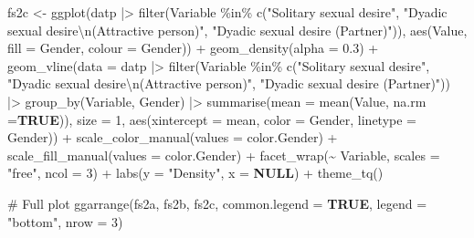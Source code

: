 \documentclass[
  bookmarksnumbered]{article}
\newenvironment{Shaded}{\begin{snugshade}}{\end{snugshade}}
\newcommand{\AttributeTok}[1]{\textcolor[rgb]{0.80,0.80,0.80}{#1}}
\newcommand{\CommentTok}[1]{\textcolor[rgb]{0.50,0.62,0.50}{#1}}
\newcommand{\ConstantTok}[1]{\textcolor[rgb]{0.86,0.64,0.64}{\textbf{#1}}}
\newcommand{\DecValTok}[1]{\textcolor[rgb]{0.86,0.86,0.80}{#1}}
\newcommand{\FloatTok}[1]{\textcolor[rgb]{0.75,0.75,0.82}{#1}}
\newcommand{\FunctionTok}[1]{\textcolor[rgb]{0.94,0.94,0.56}{#1}}
\newcommand{\NormalTok}[1]{\textcolor[rgb]{0.80,0.80,0.80}{#1}}
\newcommand{\OtherTok}[1]{\textcolor[rgb]{0.94,0.94,0.56}{#1}}
\newcommand{\SpecialCharTok}[1]{\textcolor[rgb]{0.86,0.64,0.64}{#1}}
\newcommand{\StringTok}[1]{\textcolor[rgb]{0.80,0.58,0.58}{#1}}
\begin{document}
\begin{Shaded}
\begin{Highlighting}[]
\NormalTok{fs2c }\OtherTok{\textless{}{-}} \FunctionTok{ggplot}\NormalTok{(datp }\SpecialCharTok{|\textgreater{}}
                 \FunctionTok{filter}\NormalTok{(Variable }\SpecialCharTok{\%in\%} \FunctionTok{c}\NormalTok{(}\StringTok{"Solitary sexual desire"}\NormalTok{,}
                                        \StringTok{"Dyadic sexual desire}\SpecialCharTok{\textbackslash{}n}\StringTok{(Attractive person)"}\NormalTok{,}
                                        \StringTok{"Dyadic sexual desire (Partner)"}\NormalTok{)),}
             \FunctionTok{aes}\NormalTok{(Value,}
                 \AttributeTok{fill =}\NormalTok{ Gender,}
                 \AttributeTok{colour =}\NormalTok{ Gender)) }\SpecialCharTok{+}
        \FunctionTok{geom\_density}\NormalTok{(}\AttributeTok{alpha =} \FloatTok{0.3}\NormalTok{) }\SpecialCharTok{+}
        \FunctionTok{geom\_vline}\NormalTok{(}\AttributeTok{data =}\NormalTok{ datp }\SpecialCharTok{|\textgreater{}}
                     \FunctionTok{filter}\NormalTok{(Variable }\SpecialCharTok{\%in\%} \FunctionTok{c}\NormalTok{(}\StringTok{"Solitary sexual desire"}\NormalTok{,}
                                            \StringTok{"Dyadic sexual desire}\SpecialCharTok{\textbackslash{}n}\StringTok{(Attractive person)"}\NormalTok{,}
                                            \StringTok{"Dyadic sexual desire (Partner)"}\NormalTok{)) }\SpecialCharTok{|\textgreater{}} 
                     \FunctionTok{group\_by}\NormalTok{(Variable, Gender) }\SpecialCharTok{|\textgreater{}}
                     \FunctionTok{summarise}\NormalTok{(}\AttributeTok{mean =} \FunctionTok{mean}\NormalTok{(Value, }\AttributeTok{na.rm =}\ConstantTok{TRUE}\NormalTok{)),}
                   \AttributeTok{size =} \DecValTok{1}\NormalTok{,}
                   \FunctionTok{aes}\NormalTok{(}\AttributeTok{xintercept =}\NormalTok{ mean, }\AttributeTok{color =}\NormalTok{ Gender, }\AttributeTok{linetype =}\NormalTok{ Gender)) }\SpecialCharTok{+}
        \FunctionTok{scale\_color\_manual}\NormalTok{(}\AttributeTok{values =}\NormalTok{ color.Gender) }\SpecialCharTok{+}
        \FunctionTok{scale\_fill\_manual}\NormalTok{(}\AttributeTok{values =}\NormalTok{ color.Gender) }\SpecialCharTok{+}
        \FunctionTok{facet\_wrap}\NormalTok{(}\SpecialCharTok{\textasciitilde{}}\NormalTok{ Variable,}
                   \AttributeTok{scales =} \StringTok{"free"}\NormalTok{,}
                   \AttributeTok{ncol =} \DecValTok{3}\NormalTok{) }\SpecialCharTok{+}
        \FunctionTok{labs}\NormalTok{(}\AttributeTok{y =} \StringTok{"Density"}\NormalTok{,}
             \AttributeTok{x =} \ConstantTok{NULL}\NormalTok{) }\SpecialCharTok{+}
        \FunctionTok{theme\_tq}\NormalTok{()}

\CommentTok{\# Full plot}
\FunctionTok{ggarrange}\NormalTok{(fs2a, fs2b, fs2c,}
          \AttributeTok{common.legend =} \ConstantTok{TRUE}\NormalTok{,}
          \AttributeTok{legend =} \StringTok{"bottom"}\NormalTok{,}
          \AttributeTok{nrow =} \DecValTok{3}\NormalTok{)}
\end{Highlighting}
\end{Shaded}
\end{document}
